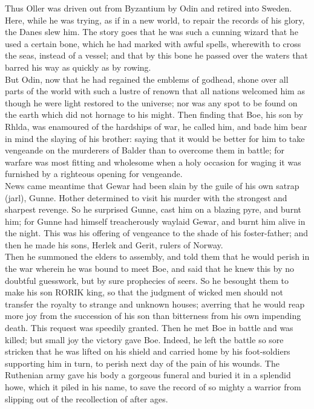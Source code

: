 \documentclass[10pt,a4paper]{report}
\begin{document}
Thus Oller was driven out from Byzantium by Odin and retired into Sweden. Here, while he was trying, as if in a new world, to repair the records of his glory, the Danes slew him. The story goes that he was such a cunning wizard that he used a certain bone, which he had marked with awful spells, wherewith to cross the seas, instead of a vessel; and that by this bone he passed over the waters that barred his way as quickly as by rowing.\\

But Odin, now that he had regained the emblems of godhead, shone over all parts of the world with such a lustre of renown that all nations welcomed him as though he were light restored to the universe; nor was any spot to be found on the earth which did not hornage to his might. Then finding that Boe, his son by Rhlda, was enamoured of the hardships of war, he called him, and bade him bear in mind the slaying of his brother: saying that it would be better for him to take vengeande on the murderers of Balder than to overcome them in battle; for warfare was most fitting and wholesome when a holy occasion for waging it was furnished by a righteous opening for vengeande.\\

News came meantime that Gewar had been slain by the guile of his own satrap (jarl), Gunne. Hother determined to visit his murder with the strongest and sharpest revenge. So he surprised Gunne, cast him on a blazing pyre, and burnt him; for Gunne had himself treacherously waylaid Gewar, and burnt him alive in the night. This was his offering of vengeance to the shade of his foster-father; and then he made his sons, Herlek and Gerit, rulers of Norway.\\

Then he summoned the elders to assembly, and told them that he would perish in the war wherein he was bound to meet Boe, and said that he knew this by no doubtful guesswork, but by sure prophecies of seers. So he besought them to make his son RORIK king, so that the judgment of wicked men should not transfer the royalty to strange and unknown houses; averring that he would reap more joy from the succession of his son than bitterness from his own impending death. This request was speedily granted. Then he met Boe in battle and was killed; but small joy the victory gave Boe. Indeed, he left the battle so sore stricken that he was lifted on his shield and carried home by his foot-soldiers supporting him in turn, to perish next day of the pain of his wounds. The Ruthenian army gave his body a gorgeous funeral and buried it in a splendid howe, which it piled in his name, to save the record of so mighty a warrior from slipping out of the recollection of after ages.\\
\end{document}
